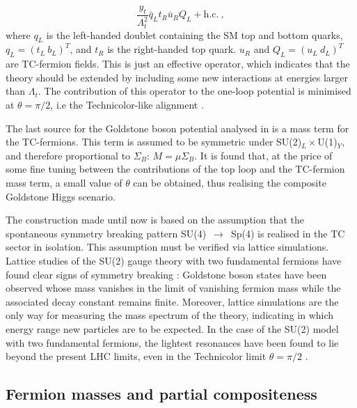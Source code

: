 \begin{equation}
\frac{y_t}{\Lambda_t^2} \bar q_L t_R \bar u_R  Q_L  + \mathrm{h.c.} \: ,
\label{}
\end{equation}
%
where $q_L$ is the left-handed doublet containing the SM top and bottom quarks, $q_L = (t_L  \: b_L)^T$, and $t_R$ is the right-handed top quark. $u_R$ and $Q_L = (u_L \: d_L)^T$ are TC-fermion fields. This is just an effective operator, which indicates that the theory should be extended by including some new interactions at energies larger than $\Lambda_t$. The contribution of this operator to the one-loop potential is minimised at $\theta = \pi/2$, i.e the Technicolor-like alignment \cite{Cacciapaglia:2014uja}.

The last source for the Goldstone boson potential analysed in \cite{Cacciapaglia:2014uja} is a mass term for the TC-fermions. This term is assumed to be symmetric under SU(2)$_L \times$U(1)$_Y$, and therefore proportional to $\Sigma_B$: $M = \mu \Sigma_B$. It is found that, at the price of some fine tuning between the contributions of the top loop and the TC-fermion mass term, a small value of $\theta$ can be obtained, thus realising the composite Goldstone Higgs scenario.

The construction made until now is based on the assumption that the spontaneous symmetry breaking pattern SU(4)~$\to$~Sp(4)  is realised in the TC sector in isolation. This assumption must be verified via lattice simulations. Lattice studies of the SU(2) gauge theory with two fundamental fermions have found clear signs of symmetry breaking \cite{Arthur:2016dir}: Goldstone boson states have been observed whose mass vanishes in the limit of vanishing fermion mass while the associated decay constant remains finite. Moreover, lattice simulations are the only way for measuring the mass spectrum of the theory, indicating in which energy range new particles are to be expected. In the case of the SU(2) model with two fundamental fermions, the lightest resonances have been found to lie beyond the present LHC limits, even in the Technicolor limit $\theta = \pi/2$ \cite{Arthur:2016dir}.


\subsection{Fermion masses and partial compositeness}
\label{partial_comp}


